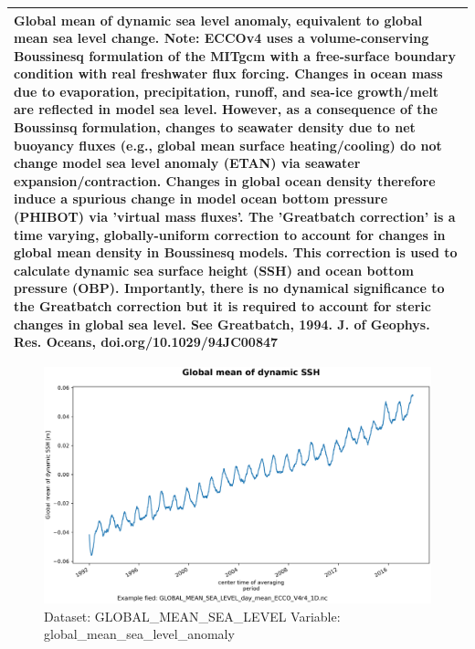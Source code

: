 \begin{longtable}{|p{}|p{}|p{}|p{}|}
\multicolumn{4}{|p{1\textwidth}|}{Global mean of dynamic sea level anomaly, equivalent to global mean sea level change. Note: ECCOv4 uses a volume-conserving Boussinesq formulation of the MITgcm with a free-surface boundary condition with real freshwater flux forcing. Changes in ocean mass due to evaporation, precipitation, runoff, and sea-ice growth/melt are reflected in model sea level. However, as a consequence of the Boussinsq formulation, changes to seawater density due to net buoyancy fluxes (e.g., global mean surface heating/cooling) do not change model sea level anomaly (ETAN) via seawater expansion/contraction. Changes in global ocean density therefore induce a spurious change in model ocean bottom pressure (PHIBOT) via 'virtual mass fluxes'. The 'Greatbatch correction' is a time varying, globally-uniform correction to account for changes in global mean density in Boussinesq models. This correction is used to calculate dynamic sea surface height (SSH) and ocean bottom pressure (OBP). Importantly, there is no dynamical significance to the Greatbatch correction but it is required to account for steric changes in global sea level. See Greatbatch, 1994. J. of Geophys. Res. Oceans, doi.org/10.1029/94JC00847} \\ \hline
\end{longtable}

\begin{figure}[H]
\centering
\includegraphics[width=\textwidth]{../images/plots/oneD_plots/Global_Mean_Sea_Level/global_mean_sea_level_anomaly.png}
\caption{Dataset: GLOBAL\_MEAN\_SEA\_LEVEL Variable: global\_mean\_sea\_level\_anomaly}
\label{tab:table-GLOBAL_MEAN_SEA_LEVEL_global_mean_sea_level_anomaly-Plot}
\end{figure}
\pagebreak
